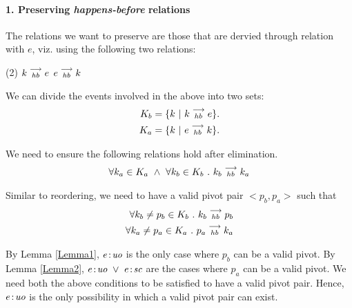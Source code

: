 \paragraph{1. Preserving \emph{happens-before} relations}
        The relations we want to preserve are those that are dervied through relation with $e$, viz. using the following two relations:
        \begin{tasks}(2)
            \task $k\stackrel{\longrightarrow}{_{hb}}e$
            \task $e\stackrel{\longrightarrow}{_{hb}}k$
        \end{tasks}

        We can divide the events involved in the above into two sets:
        \begin{align*}
            K_b = \{k \ | \ k\stackrel{\longrightarrow}{_{hb}}e \}. \\
            K_a = \{k \ | \ e\stackrel{\longrightarrow}{_{hb}}k \}. 
        \end{align*}

        We need to ensure the following relations hold after elimination.
        \begin{align*}
            \forall k_a \in K_a \ \wedge \ \forall k_b \in K_b \ . \ \reln{k_b}{hb}{k_a}
        \end{align*}

        Similar to reordering, we need to have a valid pivot pair $<p_b, p_a>$ such that 
        \begin{align*}
            \forall k_b \neq p_b \in K_b \ . \ k_b\stackrel{\longrightarrow}{_{hb}}p_b \\
            \forall k_a \neq p_a \in K_a \ . \ p_a\stackrel{\longrightarrow}{_{hb}}k_a 
        \end{align*}

        By Lemma \ref{Lemma1}, $e\!:\!\textit{uo}$ is the only case where $p_b$ can be a valid pivot. 
        By Lemma \ref{Lemma2}, $e\!:\!\textit{uo} \ \vee \ e\!:\!\textit{sc}$ are the cases where $p_a$ can be a valid pivot. 
        We need both the above conditions to be satisfied to have a valid pivot pair. 
        Hence, $e\!:\!\textit{uo}$ is the only possibility in which a valid pivot pair can exist. 


